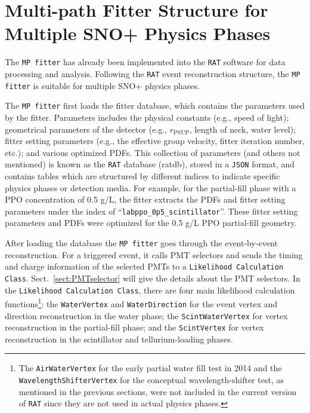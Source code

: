 \section{Multi-path Fitter Structure for Multiple SNO+ Physics Phases}

The \texttt{MP fitter} has already been implemented into the \texttt{RAT} software for data processing and analysis. Following the \texttt{RAT} event reconstruction structure, the \texttt{MP fitter} is suitable for multiple SNO+ physics phases. 

The \texttt{MP fitter} first loads the fitter database, which contains the parameters used by the fitter. Parameters includes the physical constants (e.g., speed of light); geometrical parameters of the detector (e.g., $r_\mathrm{PSUP}$, length of neck, water level); fitter setting parameters (e.g., the effective group velocity, fitter iteration number, etc.); and various optimized PDFs. This collection of parameters (and others not mentioned) is known as the \texttt{RAT} database (ratdb), stored in a \texttt{JSON} format\cite{JSONwiki}, and contains tables which are structured by different indices to indicate specific physics phases or detection media. For example, for the partial-fill phase with a PPO concentration of 0.5 g/L, the fitter extracts the PDFs and fitter setting parameters under the index of ``\texttt{labppo\_0p5\_scintillator}''. These fitter setting parameters and PDFs were optimized for the 0.5 g/L PPO partial-fill geometry.

After loading the database the \texttt{MP fitter} goes through the event-by-event reconstruction. For a triggered event, it calls PMT selectors and sends the timing and charge information of the selected PMTs to a \texttt{Likelihood Calculation Class}. Sect.~\ref{sect:PMTselector} will give the details about the PMT selectors. In the \texttt{Likelihood Calculation Class}, there are four main likelihood calculation functions\footnote{The \texttt{AirWaterVertex} for the early partial water fill test in 2014 and the \texttt{WavelengthShifterVertex} for the conceptual wavelength-shifter test, as mentioned in the previous sections, were not included in the current version of \texttt{RAT} since they are not used in actual physics phases.}: the \texttt{WaterVertex} and \texttt{WaterDirection} for the event vertex and direction reconstruction in the water phase; the \texttt{ScintWaterVertex} for vertex reconstruction in the partial-fill phase; and the \texttt{ScintVertex} for vertex reconstruction in the scintillator and tellurium-loading phases.


